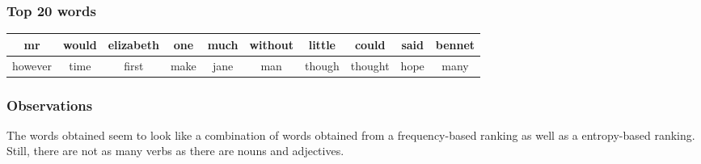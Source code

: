 \documentclass{article}
\begin{document}
\subsubsection{Top 20 words}
\begin{center}
\begin{tabular}{|c|c|c|c|c|c|c|c|c|c|}
\hline
mr & would & elizabeth & one & much & without & little & could & said & bennet\\
\hline
however & time & first & make & jane & man & though & thought & hope & many\\
\hline
\end{tabular}
\end{center}

\subsubsection{Observations}
The words obtained seem to look like a combination of words obtained from a frequency-based ranking as well as a entropy-based ranking. Still, there are not as many verbs as there are nouns and adjectives.
\end{document}
